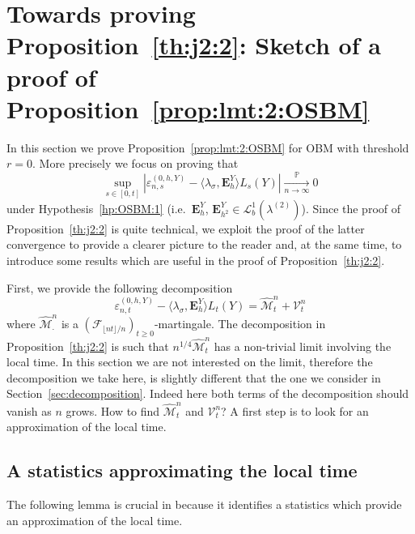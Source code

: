 \documentclass[12pt]{article}
\numberwithin{equation}{section}
\theoremstyle{definition}
\theoremstyle{remark}
\newcommand{\convp}[1][]{\xrightarrow[#1]{\PP}}
\newcommand{\PP}{\mathbb{P}}
\newcommand{\cF}{\mathcal{F}}
\newcommand{\Lgb}[1]{\mathcal{L}^{1}_{b}(\lambda^{(#1)})}
\newcommand{\bfH}[1]{\mathbf{E}^Y_{#1}}
\begin{document}
\section{Towards proving Proposition~\ref{th:j2:2}: Sketch of a proof of Proposition~\ref{prop:lmt:2:OSBM}} \label{app:prop:lmt:2}

In this section we prove  
Proposition~\ref{prop:lmt:2:OSBM} for OBM with threshold $r=0$. 
More precisely we focus on proving that
\begin{equation} \label{eq:conv:decomp:fake}
	\sup_{s\in [0,t]} \left| \varepsilon_{n,s}^{(0,h,Y)} - \langle \lambda_\sigma , \bfH h \rangle L_s(Y)\right|
	\convp[n\to\infty] 0 
\end{equation}
under Hypothesis~\ref{hp:OSBM:1} (i.e.~$\bfH{h}$, $\bfH{h^2} \in \Lgb{2}$).
Since the proof of Proposition~\ref{th:j2:2} is quite technical, we exploit the proof of the latter convergence to provide a clearer picture to the reader and, at the same time, to introduce some results which are useful in the proof of Proposition~\ref{th:j2:2}.

First, we provide the following decomposition
\begin{equation} \label{eq:decomposition:bis}
	 \varepsilon_{n,t}^{(0,h,Y)} - \langle \lambda_\sigma , \bfH h \rangle L_t(Y)
	=		 
	\widehat{\mathcal{M}}^n_t + \mathcal{V}^n_t
\end{equation}
where $\widehat{\mathcal{M}}^n_\cdot$ is a $(\cF_{\lfloor n t \rfloor/n})_{t\geq 0}$-martingale.
%
%
The decomposition in Proposition~\ref{th:j2:2} is such that $n^{1/4}\widehat{\mathcal{M}}^n_t$ has a non-trivial limit involving the local time.
In this section we are not interested on the limit, therefore the decomposition we take here, is slightly different that the one we consider in Section~\ref{sec:decomposition}. 
Indeed here both terms of the decomposition should vanish as $n$ grows.
How to find $\widehat{\mathcal{M}}^n_t$ and $\mathcal{V}^n_t$? 
A first step is to look for an approximation of the local time.



\subsection{A statistics approximating the local time}

The following lemma is crucial in because it identifies a statistics which provide an approximation of the local time.
\end{document}
